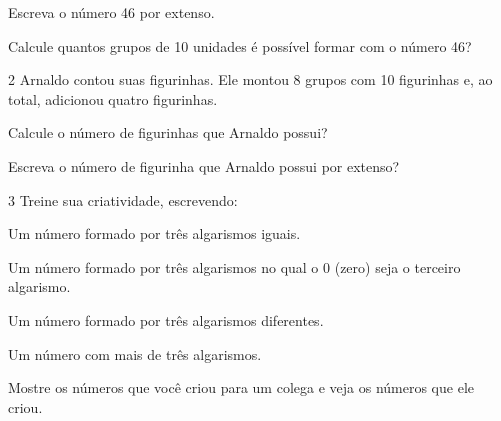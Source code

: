\begin{escolha}
\item  Escreva o número 46 por extenso.

\item Calcule quantos grupos de 10 unidades é possível formar com o número 46?
\end{escolha}

\num{2} Arnaldo contou suas figurinhas. Ele montou 8 grupos com 10 figurinhas e, ao total, adicionou quatro figurinhas.

\begin{escolha}
\item
  Calcule o número de figurinhas que Arnaldo possui?\\

\item  Escreva o número de figurinha que Arnaldo possui por extenso?\\
\end{escolha}

\num{3} Treine sua criatividade, escrevendo:

\begin{escolha}
\item Um número formado por três algarismos iguais.\\

\item Um número formado por três algarismos no qual o 0 (zero) seja o terceiro algarismo.\\

\item Um número formado por três algarismos diferentes.\\

\item Um número com mais de três algarismos.\\

\item Mostre os números que você criou para um colega e veja os números que ele criou.
\end{escolha}

